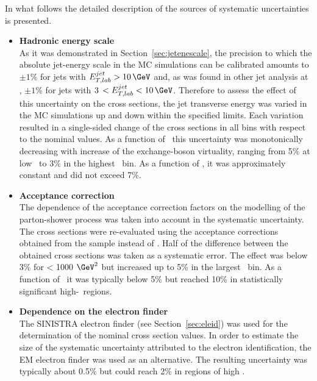 In what follows the detailed description of the sources of systematic uncertainties is presented.
\begin{itemize}
	\item \textbf{Hadronic energy scale} \\
		As it was demonstrated in Section~\ref{sec:jetenescale}, the precision to which the absolute jet-energy scale in the MC simulations can be calibrated amounts to $\pm1\%$ for jets with $\etjetlab > 10\,\GeV$ and, as was found in other jet analysis at \zeus, $\pm1\%$ for jets with $3\,< \etjetlab < 10\,\GeV$. Therefore to assess the effect of this uncertainty on the cross sections, the jet transverse energy was varied in the MC simulations up and down within the specified limits. Each variation resulted in a single-sided change of the cross sections in all bins with respect to the nominal values. As a function of \qsq~this uncertainty was monotonically decreasing with increase of the exchange-boson virtuality, ranging from 5\% at low \qsq~to 3\% in the highest \qsq~bin. As a function of \etjetb, it was approximately constant and did not exceed 7\%.
		
	\item \textbf{Acceptance correction} \\
		The dependence of the acceptance correction factors on the modelling of the parton-shower process was taken into account in the systematic uncertainty. The cross sections were re-evaluated using the acceptance corrections obtained from the \ariadne sample instead of \lepto. Half of the difference between the obtained cross sections was taken as a systematic error. The effect was below 3\% for \qsq < 1000 $\GeV^2$ but increased up to 5\% in the largest \qsq~bin. As a function of \etjetb~it was typically below 5\% but reached 10\% in statistically significant high-\etjetb~regions.
			
	\item \textbf{Dependence on the electron finder}\\
		The \textsc{SINISTRA} electron finder (see Section~\ref{sec:eleid}) was used for the determination of the nominal cross section values. In order to estimate the size of the systematic uncertainty attributed to the electron identification, the \textsc{EM} electron finder was used as an alternative. The resulting uncertainty was typically about 0.5\% but could reach 2\% in regions of high \qsq.
	

\end{itemize}
